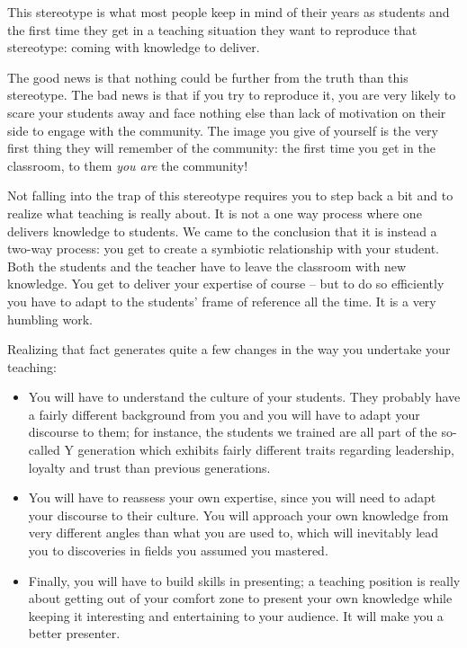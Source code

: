 This stereotype is what most people keep in mind of their years as students and
the first time they get in a teaching situation they want to reproduce that
stereotype: coming with knowledge to deliver.

The good news is that nothing could be further from the truth than this
stereotype. The bad news is that if you try to reproduce it, you are very likely
to scare your students away and face nothing else than lack of motivation on
their side to engage with the community. The image you give of yourself is the
very first thing they will remember of the community: the first time you get in
the classroom, to them \emph{you are} the community!

Not falling into the trap of this stereotype requires you to step back a bit and to realize what teaching is really about. It is not a one way process where one
delivers knowledge to students. We came to the conclusion that it is instead a
two-way process: you get to create a symbiotic relationship with your student.
Both the students and the teacher have to leave the classroom with new
knowledge. You get to deliver your expertise of course -- but to do so efficiently
you have to adapt to the students' frame of reference all the time. It is a very
humbling work.

Realizing that fact generates quite a few changes in the way you undertake
your teaching:
\begin{itemize}
  \item You will have to understand the culture of your students. They probably
have a fairly different background from you and you will have to adapt your
discourse to them; for instance, the students we trained are all part of the so-called Y generation which exhibits fairly different traits regarding leadership, loyalty and trust than previous generations.
  \item You will have to reassess your own expertise, since you will need to
adapt your discourse to their culture. You will approach your own knowledge from
very different angles than what you are used to, which will inevitably lead you
to discoveries in fields you assumed you mastered.
  \item Finally, you will have to build skills in presenting; a teaching
position is really about getting out of your comfort zone to present your own
knowledge while keeping it interesting and entertaining to your audience. It
will make you a better presenter.
\end{itemize}

